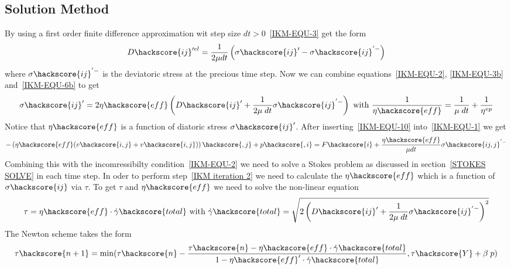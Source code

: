 \subsection{Solution Method \label{IKM-SOLVE}}
By using a first order finite difference approximation wit step size $dt>0$~\ref{IKM-EQU-3} get the form
\begin{equation}\label{IKM-EQU-3b}
D\hackscore{ij}'^{el}=\frac{1}{2 \mu dt } \left( \sigma\hackscore{ij}' - \sigma\hackscore{ij}^{'-} \right)
\end{equation}
where $\sigma\hackscore{ij}^{'-}$ is the deviatoric stress at the precious time step.
Now we can combine equations~\ref{IKM-EQU-2}, \ref{IKM-EQU-3b} and~\ref{IKM-EQU-6b} to get
\begin{equation}\label{IKM-EQU-10}
\sigma\hackscore{ij}' =  2 \eta\hackscore{eff}  \left( D\hackscore{ij}' + 
\frac{1}{  2 \mu \; dt} \sigma\hackscore{ij}^{'-}\right)  \mbox{ with }
\frac{1}{\eta\hackscore{eff}}=\frac{1}{\mu \; dt}+\frac{1}{\eta^{vp}}
\end{equation}
Notice that $\eta\hackscore{eff}$ is a function of diatoric stress $\sigma\hackscore{ij}'$.
After inserting~\ref{IKM-EQU-10} into~\ref{IKM-EQU-1} we get
\begin{equation}\label{IKM-EQU-1ib}
-\left(\eta\hackscore{eff} (v\hackscore{i,j}+ v\hackscore{i,j})
\right)\hackscore{,j}+p\hackscore{,i}=F\hackscore{i}+
\frac{\eta\hackscore{eff}}{\mu dt } \sigma\hackscore{ij,j}^{'-}
\end{equation}
Combining this with the incomressibilty condition~\ref{IKM-EQU-2} we need to solve a
Stokes problem as discussed in section~\ref{STOKES SOLVE} in each time step.
In oder to perform step~\ref{IKM iteration 2} we need to calculate the $\eta\hackscore{eff}$ which 
is a function of $\sigma\hackscore{ij}$ via $\tau$.  To get $\tau$ and $\eta\hackscore{eff}$ we need to solve the
non-linear equation
\begin{equation}
\tau = \eta\hackscore{eff} \cdot \dot{\gamma}\hackscore{total} \mbox{ with }
\dot{\gamma}\hackscore{total} = \sqrt{ 2 \left( D\hackscore{ij}' + 
\frac{1}{  2 \mu \; dt} \sigma\hackscore{ij}^{'-}\right)^2}
\label{IKM iteration 5}
\end{equation} 
The Newton scheme takes the form 
\begin{equation}
\tau\hackscore{n+1} = \min(\tau\hackscore{n} - \frac{\tau\hackscore{n} - \eta\hackscore{eff}  \cdot \dot{\gamma}\hackscore{total}}{1 - \eta\hackscore{eff}'  \cdot  \dot{\gamma}\hackscore{total}}, \tau\hackscore{Y} + \beta \; p)
\label{IKM iteration 6}
\end{equation} 
